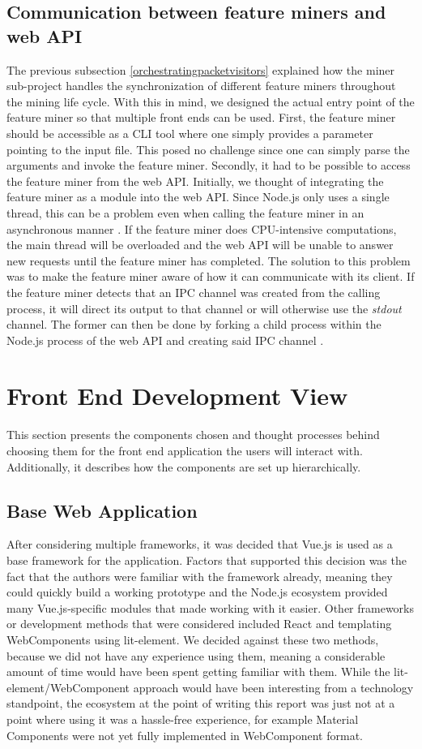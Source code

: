 \subsection{Communication between feature miners and web API}
The previous subsection \ref{orchestratingpacketvisitors} explained how the miner sub-project handles the synchronization of different feature miners throughout the mining life cycle. With this in mind, we designed the actual entry point of the feature miner so that multiple front ends can be used. First, the feature miner should be accessible as a CLI tool where one simply provides a parameter pointing to the input file. This posed no challenge since one can simply parse the arguments and invoke the feature miner.
Secondly, it had to be possible to access the feature miner from the web API. Initially, we thought of integrating the feature miner as a module into the web API. Since Node.js only uses a single thread, this can be a problem even when calling the feature miner in an asynchronous manner \cite{nodejs_about}. If the feature miner does CPU-intensive computations, the main thread will be overloaded and the web API will be unable to answer new requests until the feature miner has completed.
The solution to this problem was to make the feature miner aware of how it can communicate with its client. If the feature miner detects that an IPC channel was created from the calling process, it will direct its output to that channel or will otherwise use the \textit{stdout} channel. The former can then be done by forking a child process within the Node.js process of the web API and creating said IPC channel \cite{nodejs_childprocesses}.


 \section{Front End Development View}
 This section presents the components chosen and thought processes behind choosing them for the front end application the users will interact with. Additionally, it describes how the components are set up hierarchically.
 \subsection{Base Web Application}
 After considering multiple frameworks, it was decided that Vue.js is used as a base framework for the application. Factors that supported this decision was the fact that the authors were familiar with the framework already, meaning they could quickly build a working prototype and the Node.js ecosystem provided many Vue.js-specific modules that made working with it easier. Other frameworks or development methods that were considered included React and templating WebComponents using lit-element. We decided against these two methods, because we did not have any experience using them, meaning a considerable amount of time would have been spent getting familiar with them. While the lit-element/WebComponent approach would have been interesting from a technology standpoint, the ecosystem at the point of writing this report was just not at a point where using it was a hassle-free experience, for example Material Components were not yet fully implemented in WebComponent format.
 
